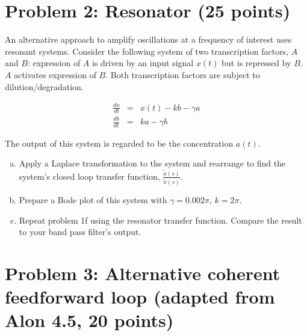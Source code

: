 \documentclass{article}
\begin{document}
\section*{Problem 2: Resonator (25 points)}

An alternative approach to amplify oscillations at a frequency of interest uses resonant systems. Consider the following system of two transcription factors, $A$ and $B$: expression of $A$ is driven by an input signal $x(t)$ but is repressed by $B$. $A$ activates expression of $B$. Both transcription factors are subject to dilution/degradation.

\begin{eqnarray*}
\frac{da}{dt} & = & x(t) - k b - \gamma a\\
\frac{db}{dt} & = & ka - \gamma b
\end{eqnarray*}

The output of this system is regarded to be the concentration $a(t)$.

\begin{enumerate}[a)]
\setlength{\itemsep}{0pt}
\item Apply a Laplace transformation to the system and rearrange to find the system's closed loop transfer function, $\frac{\tilde{a}(s)}{\tilde{x}(s)}$.
\item Prepare a Bode plot of this system with $\gamma=0.002 \pi $, $k=2\pi$.
\item Repeat problem 1f using the resonator transfer function. Compare the result to your band pass filter's output.
\end{enumerate}

\section*{Problem 3: Alternative coherent feedforward loop (adapted from Alon 4.5, 20 points)}
\end{document}
